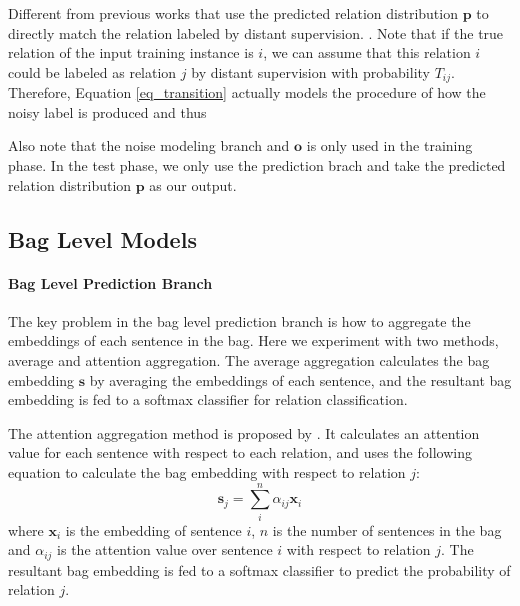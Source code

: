 Different from previous works that use the predicted relation distribution $\mathbf{p}$ to directly match the relation labeled by distant supervision. . Note that if the true relation of the input training instance is $i$, we can assume that this relation $i$ could be labeled as relation $j$ by distant supervision with probability $T_{ij}$. Therefore, Equation \ref{eq_transition} actually models the procedure of how the noisy label is produced and thus 

Also note that the noise modeling branch and $\mathbf{o}$ is only used in the training phase. In the test phase, we only use the prediction brach and take the predicted relation distribution $\mathbf{p}$ as our output. 

\subsection{Bag Level Models}
\paragraph{Bag Level Prediction Branch}
The key problem in the bag level prediction branch is how to aggregate the embeddings of each sentence in the bag. Here we experiment with two methods, average and attention aggregation. The average aggregation calculates the bag embedding $\mathbf{s}$ by averaging the embeddings of each sentence, and the resultant bag embedding is fed to a softmax classifier for relation classification.

The attention aggregation method is proposed by \cite{lin2016neural}. It calculates an attention value for each sentence with respect to each relation, and uses the following equation to calculate the bag embedding with respect to relation $j$:
\begin{equation}
\mathbf{s}_j = \sum_i^{n}{\alpha_{ij} \mathbf{x}_{i}}
\label{eq_att_bag_embed}
\end{equation}
where $\mathbf{x}_{i}$ is the embedding of sentence $i$, $n$ is the number of sentences in the bag and $\alpha_{ij}$ is the attention value over sentence $i$ with respect to relation $j$. The resultant bag embedding is fed to a softmax classifier to predict the probability of relation $j$.

